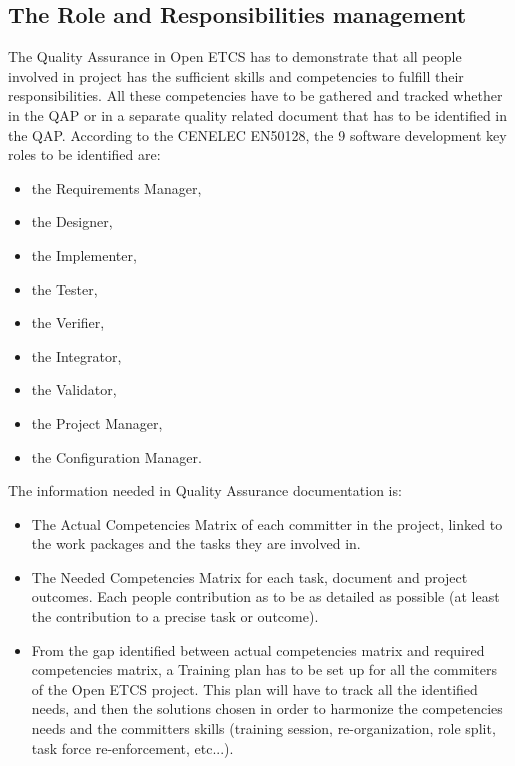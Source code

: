 \documentclass{template/openetcs_article}
\begin{document}
\subsection{The Role and Responsibilities management}
The Quality Assurance in Open ETCS has to demonstrate that all people involved in project has the sufficient skills and competencies to fulfill their responsibilities. All these competencies have to be gathered and tracked whether in the QAP or in a separate quality related document that has to be identified in the QAP.
According to the CENELEC EN50128, the 9 software development key roles to be identified are:
\begin{itemize}
\item the Requirements Manager,
\item the Designer,
\item the Implementer,
\item the Tester,
\item the Verifier,
\item the Integrator,
\item the Validator,
\item the Project Manager,
\item the Configuration Manager.
\end{itemize}

The information needed in Quality Assurance documentation is:
\begin{itemize}
\item The Actual Competencies Matrix of each committer in the project, linked to the work packages and the tasks they are involved in.
\item The Needed Competencies Matrix for each task, document and project outcomes. Each people contribution as to be as detailed as possible (at least the contribution to a precise task or outcome).
\item From the gap identified between actual competencies matrix and required competencies matrix, a Training plan has to be set up for all the commiters of the Open ETCS project. This plan will have to track all the identified needs, and then the solutions chosen in order to harmonize the competencies needs and the committers skills (training session, re-organization, role split, task force re-enforcement, etc...).
\end{itemize}
\end{document}
